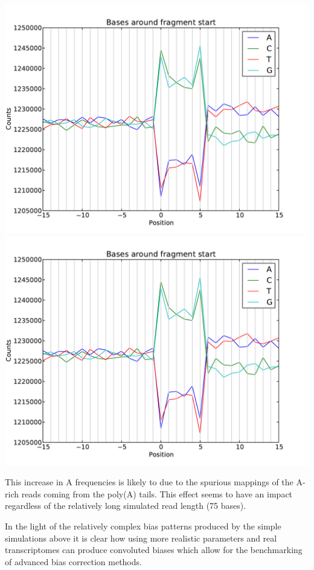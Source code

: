 \begin{center}
\includegraphics[scale=0.6,page=1]{../src/test/pos_bias/pb_full_polya.pdf}
\\
\includegraphics[scale=0.6,page=2]{../src/test/pos_bias/pb_full_polya.pdf}
\end{center}

This increase in A frequencies is likely to due to the spurious mappings of the A-rich reads coming from the poly(A) tails. This effect seems to have an impact regardless of the relatively long simulated read length (75 bases).

In the light of the relatively complex bias patterns produced by the simple simulations above it is clear how using more realistic parameters and real transcriptomes can produce convoluted biases which allow for the benchmarking of advanced bias correction methods.

